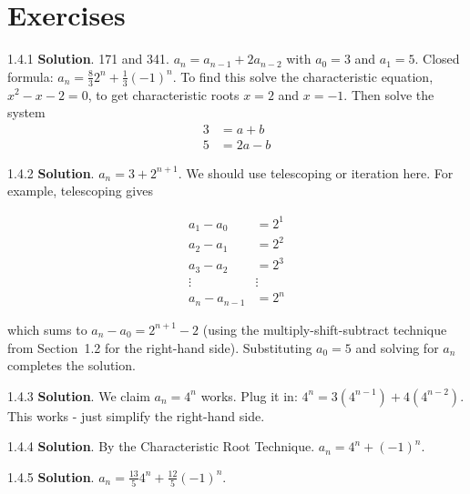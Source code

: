 \documentclass[11pt,]{book}
\theoremstyle{ptxplainnotitle}
\theoremstyle{ptxplaintitle}
\theoremstyle{ptxdefinitionnotitle}
\theoremstyle{ptxdefinitiontitle}
\theoremstyle{ptxdefinitionnotitle}
\theoremstyle{ptxdefinitiontitle}
\theoremstyle{ptxdefinitionnotitle}
\theoremstyle{ptxdefinitiontitle}
\theoremstyle{ptxdefinitiontitlenonumber}
\theoremstyle{ptxdefinitiontitlenonumber}
\numberwithin{equation}{chapter}
\newcommand{\amp}{&}
\begin{document}
\section*{Exercises}
\begin{divisionexercise}{1.4.1}
\textbf{Solution}.\quad%
\hypertarget{p-471}{}%
171 and 341. \(a_n = a_{n-1} + 2a_{n-2}\) with \(a_0 = 3\) and \(a_1 = 5\). Closed formula: \(a_n = \frac{8}{3}2^n + \frac{1}{3}(-1)^n\).  To find this solve the characteristic equation, \(x^2 - x - 2 = 0\), to get characteristic roots \(x = 2\) and \(x=-1\).  Then solve the system%
\begin{align*}
3 \amp = a + b\\
5 \amp = 2a - b
\end{align*}
%
\end{divisionexercise}%
\begin{divisionexercise}{1.4.2}
\textbf{Solution}.\quad%
\hypertarget{p-477}{}%
\(a_n = 3 + 2^{n+1}\text{.}\)  We should use telescoping or iteration here.  For example, telescoping gives%
\par
\hypertarget{p-478}{}%
%
\begin{equation*}
\begin{aligned}
a_1 - a_0 \amp = 2^1\\
a_2 - a_1 \amp = 2^2\\
a_3 - a_2 \amp = 2^3\\
\vdots\amp \vdots \\
a_n - a_{n-1} \amp = 2^n
\end{aligned}
\end{equation*}
%
\par
\hypertarget{p-479}{}%
which sums to \(a_n - a_0 = 2^{n+1} - 2\) (using the multiply-shift-subtract technique from Section~1.2 for the right-hand side).  Substituting \(a_0 = 5\) and solving for \(a_n\) completes the solution.%
\end{divisionexercise}%
\begin{divisionexercise}{1.4.3}
\textbf{Solution}.\quad%
\hypertarget{p-481}{}%
We claim \(a_n = 4^n\) works. Plug it in: \(4^n = 3(4^{n-1}) + 4(4^{n-2})\). This works - just simplify the right-hand side.%
\end{divisionexercise}%
\begin{divisionexercise}{1.4.4}
\textbf{Solution}.\quad%
\hypertarget{p-485}{}%
By the Characteristic Root Technique. \(a_n = 4^n + (-1)^n\text{.}\)%
\end{divisionexercise}%
\begin{divisionexercise}{1.4.5}
\textbf{Solution}.\quad%
\hypertarget{p-489}{}%
\(a_n = \frac{13}{5} 4^n + \frac{12}{5} (-1)^n\text{.}\)%
\end{divisionexercise}%
\end{document}
